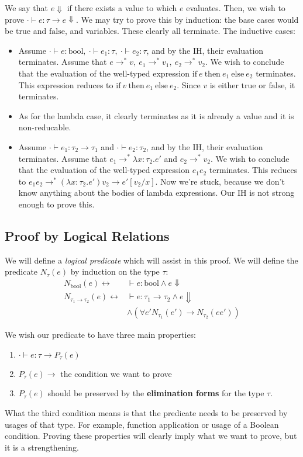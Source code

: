 We say that $e \Downarrow$ if there exists a value to which $e$ evaluates. Then, we wish to prove $\cdot \vdash e : \tau \to e \Downarrow$.
We may try to prove this by induction: the base cases would be $\mathrm{true}$ and $\mathrm{false}$, and variables. These clearly all
terminate. The inductive cases:
\begin{itemize}
\item Assume $\cdot \vdash e : \mathrm{bool},~\cdot\vdash e_1 : \tau,~\cdot\vdash e_2 : \tau$, and by the IH, their evaluation 
terminates. Assume that $e \to^* v,~e_1\to^* v_1,~e_2 \to^* v_2$. We wish to conclude that the evaluation of the well-typed expression
$\mathrm{if}~e~\mathrm{then}~e_1~\mathrm{else}~e_2$ terminates. This expression reduces to $\mathrm{if}~v~\mathrm{then}~e_1~\mathrm{else}~e_2$.
Since $v$ is either $\mathrm{true}$ or $\mathrm{false}$, it terminates.
\item As for the lambda case, it clearly terminates as it is already a value and it is non-reducable.
\item Assume $\cdot \vdash e_1 : \tau_2 \to \tau_1$ and $\cdot \vdash e_2 : \tau_2$, and by the IH, their evaluation
terminates. Assume that $e_1 \to^* \lambda x: \tau_2. e'$ and $e_2 \to^* v_2$. We wish to conclude that the evaluation of the
well-typed expression $e_1 e_2$ terminates. This reduces to $e_1 e_2 \to^* (\lambda x: \tau_2. e') v_2 \to e'[v_2/x]$. 
Now we're stuck, because we don't know anything about the bodies of lambda expressions. Our IH is not strong enough to prove this.
\end{itemize}

\subsection{Proof by Logical Relations}
We will define a \emph{logical predicate} which will assist in this proof. We will define the predicate $N_\tau(e)$
by induction on the type $\tau$:
\[
\begin{array}{rl}
N_\mathrm{bool}(e)\leftrightarrow& \vdash e: \mathrm{bool} \wedge e \Downarrow \\
N_{\tau_1 \to \tau_2}(e)\leftrightarrow& \vdash e: \tau_1 \to \tau_2 \wedge e \Downarrow\\
& \wedge (\forall e' N_{\tau_1}(e') \to N_{\tau_2} (e e'))
\end{array}
\]

We wish our predicate to have three main properties:
\begin{enumerate}
\item $\cdot \vdash e: \tau \to P_\tau(e)$
\item $P_\tau(e) \to$ the condition we want to prove
\item $P_\tau(e)$ should be preserved by the \textbf{elimination forms} for the type $\tau$.
\end{enumerate}
What the third condition means is that the predicate needs to be preserved by usages of that type. 
For example, function application or usage of a Boolean condition. Proving these properties will
clearly imply what we want to prove, but it is a strengthening.

